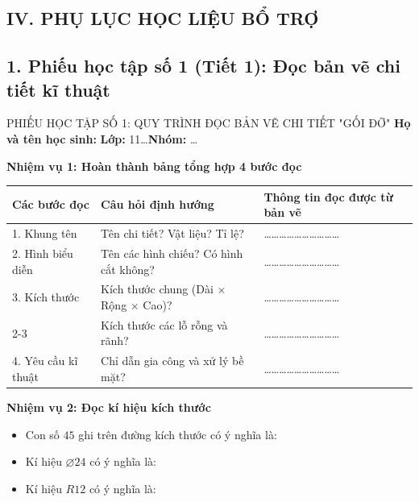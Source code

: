 \documentclass[12pt, a4paper]{article}
\begin{document}
\begin{itemize}[leftmargin=1.2cm]
\section*{IV. PHỤ LỤC HỌC LIỆU BỔ TRỢ}

\subsection*{1. Phiếu học tập số 1 (Tiết 1): Đọc bản vẽ chi tiết kĩ thuật}

\begin{pedabox}{PHIẾU HỌC TẬP SỐ 1: QUY TRÌNH ĐỌC BẢN VẼ CHI TIẾT "GỐI ĐỠ"}
    \textbf{Họ và tên học sinh:} \dotfill \textbf{Lớp:} 11\dots \textbf{Nhóm:} \dots
    
    \textbf{Nhiệm vụ 1: Hoàn thành bảng tổng hợp 4 bước đọc}
    \begin{center}
    \begin{tabular}{|l|l|l|}
    \hline
    \textbf{Các bước đọc} & \textbf{Câu hỏi định hướng} & \textbf{Thông tin đọc được từ bản vẽ} \\ \hline
    1. Khung tên & Tên chi tiết? Vật liệu? Tỉ lệ? & \dots\dots\dots\dots\dots\dots\dots\dots\dots\dots \\ \hline
    2. Hình biểu diễn & Tên các hình chiếu? Có hình cắt không? & \dots\dots\dots\dots\dots\dots\dots\dots\dots\dots \\ \hline
    3. Kích thước & Kích thước chung (Dài $\times$ Rộng $\times$ Cao)? & \dots\dots\dots\dots\dots\dots\dots\dots\dots\dots \\ \cline{2-3}
     & Kích thước các lỗ rỗng và rãnh? & \dots\dots\dots\dots\dots\dots\dots\dots\dots\dots \\ \hline
    4. Yêu cầu kĩ thuật & Chỉ dẫn gia công và xử lý bề mặt? & \dots\dots\dots\dots\dots\dots\dots\dots\dots\dots \\ \hline
    \end{tabular}
    \end{center}

    \textbf{Nhiệm vụ 2: Đọc kí hiệu kích thước}
    \begin{itemize}[leftmargin=0.6cm]
        \item Con số $45$ ghi trên đường kích thước có ý nghĩa là: \dotfill
        \item Kí hiệu $\varnothing 24$ có ý nghĩa là: \dotfill
        \item Kí hiệu $R12$ có ý nghĩa là: \dotfill
    \end{itemize}
\end{pedabox}


\end{itemize}
\end{document}
